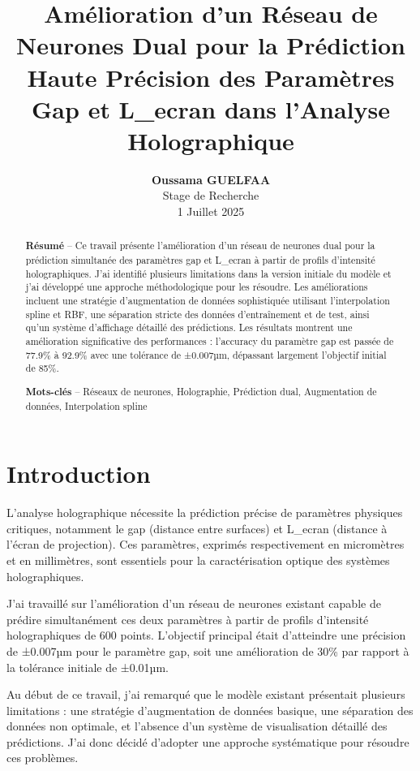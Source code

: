 \documentclass[10pt,twocolumn]{article}
\title{\Large\textbf{Amélioration d'un Réseau de Neurones Dual pour la Prédiction Haute Précision des Paramètres Gap et L\_ecran dans l'Analyse Holographique}}
\author{
    \textbf{Oussama GUELFAA}\\
    \small Stage de Recherche\\
    \small 1 Juillet 2025
}
\date{}
\begin{document}
\maketitle

\begin{abstract}
\textbf{Résumé} -- Ce travail présente l'amélioration d'un réseau de neurones dual pour la prédiction simultanée des paramètres gap et L\_ecran à partir de profils d'intensité holographiques. J'ai identifié plusieurs limitations dans la version initiale du modèle et j'ai développé une approche méthodologique pour les résoudre. Les améliorations incluent une stratégie d'augmentation de données sophistiquée utilisant l'interpolation spline et RBF, une séparation stricte des données d'entraînement et de test, ainsi qu'un système d'affichage détaillé des prédictions. Les résultats montrent une amélioration significative des performances : l'accuracy du paramètre gap est passée de 77.9\% à 92.9\% avec une tolérance de ±0.007µm, dépassant largement l'objectif initial de 85\%.

\textbf{Mots-clés} -- Réseaux de neurones, Holographie, Prédiction dual, Augmentation de données, Interpolation spline
\end{abstract}

\section{Introduction}

L'analyse holographique nécessite la prédiction précise de paramètres physiques critiques, notamment le gap (distance entre surfaces) et L\_ecran (distance à l'écran de projection). Ces paramètres, exprimés respectivement en micromètres et en millimètres, sont essentiels pour la caractérisation optique des systèmes holographiques.

J'ai travaillé sur l'amélioration d'un réseau de neurones existant capable de prédire simultanément ces deux paramètres à partir de profils d'intensité holographiques de 600 points. L'objectif principal était d'atteindre une précision de ±0.007µm pour le paramètre gap, soit une amélioration de 30\% par rapport à la tolérance initiale de ±0.01µm.

Au début de ce travail, j'ai remarqué que le modèle existant présentait plusieurs limitations : une stratégie d'augmentation de données basique, une séparation des données non optimale, et l'absence d'un système de visualisation détaillé des prédictions. J'ai donc décidé d'adopter une approche systématique pour résoudre ces problèmes.
\end{document}
